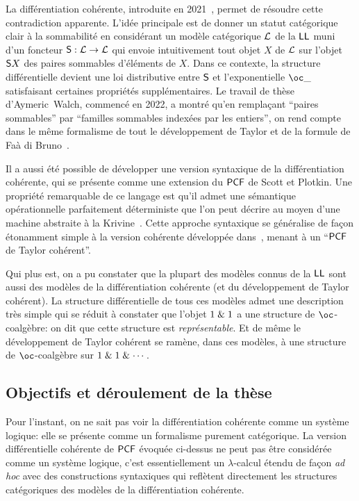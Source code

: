 \documentclass[a4]{article}
\begin{document}
La différentiation cohérente, introduite en 2021~\cite{Ehrhard23a},
permet de résoudre cette contradiction apparente.
%
L'idée principale est de donner un statut catégorique clair à la
sommabilité en considérant un modèle catégorique $\mathcal{L}$ de la $\hbox{\textsf{LL}}$
muni d'un foncteur ${\mathsf S}:\mathcal{L}\to\mathcal{L}$ qui envoie intuitivement tout
objet $X$ de $\mathcal{L}$ sur l'objet ${\mathsf S} X$ des paires sommables
d'éléments de $X$.
%
Dans ce contexte, la structure différentielle devient une loi
distributive entre ${\mathsf S}$ et l'exponentielle $\Oc\_$ satisfaisant
certaines propriétés supplémentaires.
%
Le travail de thèse d'Aymeric~Walch, commencé en 2022, a montré qu'en
remplaçant ``paires sommables'' par ``familles sommables indexées par
les entiers'', on rend compte dans le même formalisme de tout le
développement de Taylor et de la formule de Faà di
Bruno~\cite{EhrhardWalch23b}.

Il a aussi été possible de développer une version syntaxique de la
diffé\-ren\-tia\-tion cohérente, qui se présente comme une extension du
$\mathsf{PCF}$ de Scott et Plotkin.
%
Une propriété remarquable de ce langage est qu'il admet une sémantique
opérationnelle parfaitement déterministe que l'on peut décrire au
moyen d'une machine abstraite à la Krivine~\cite{Ehrhard23b}.
%
Cette approche syntaxique se généralise de façon étonamment simple à
la version cohérente développée dans~\cite{EhrhardWalch23b}, menant à
un ``$\mathsf{PCF}$ de Taylor cohérent''.

Qui plus est, on a pu constater que la plupart des modèles connus de
la $\hbox{\textsf{LL}}$ sont aussi des modèles de la différentiation cohérente (et du
développement de Taylor cohérent).
%
La structure différentielle de tous ces modèles admet une description
très simple qui se réduit à constater que l'objet ${1}\mathrel{\&}{1}$ a
une structure de $\oc$-coalgèbre: on dit que cette structure est
\emph{représentable}.
%
Et de même le développement de Taylor cohérent se ramène, dans ces
modèles, à une structure de $\oc$-coalgèbre sur
$1\mathrel{\&}1\mathrel{\&}\cdots$.

\subsection*{Objectifs et déroulement de la thèse}
Pour l'instant, on ne sait pas voir la différentiation cohérente comme
un système logique: elle se présente comme un formalisme purement
catégorique.
%
La version différentielle cohérente de $\mathsf{PCF}$ évoquée ci-dessus ne
peut pas être considérée comme un système logique, c'est
essentiellement un $\lambda$-calcul étendu de façon \emph{ad hoc} avec
des constructions syntaxiques qui reflètent directement les structures
catégoriques des modèles de la différentiation cohérente.
\end{document}
